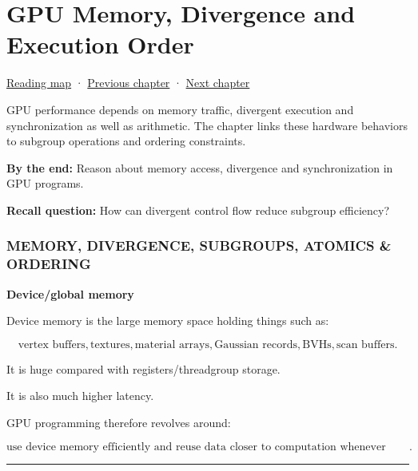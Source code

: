\chapter{GPU Memory, Divergence and Execution Order}\label{03-visual-computing-i-ch016-gpu-memory-divergence-and-execution-order}\hypertarget{03-visual-computing-i-ch016}{}\label{stagechapter:03-visual-computing-i-ch016}

\hypertarget{03-visual-computing-i-ch016-gpu-memory-divergence-and-execution-order}{}

\hyperref[volume-reading-map]{Reading map} · \hyperref[03-visual-computing-i-ch011]{Previous chapter} · \hyperref[05-engine-i-ch019]{Next chapter}

GPU performance depends on memory traffic, divergent execution and synchronization as well as arithmetic. The chapter links these hardware behaviors to subgroup operations and ordering constraints.

\textbf{By the end:} Reason about memory access, divergence and synchronization in GPU programs.

\textbf{Recall question:} How can divergent control flow reduce subgroup efficiency?

\subsection{MEMORY, DIVERGENCE, SUBGROUPS, ATOMICS \& ORDERING}\label{03-visual-computing-i-ch016-memory-divergence-subgroups-atomics-ordering}

\hypertarget{03-visual-computing-i-ch016-memory-divergence-subgroups-atomics-ordering}{}

\textbf{Device/global memory}

Device memory is the large memory space holding things such as:

\[
\text{vertex buffers},
\text{textures},
\text{material arrays},
\text{Gaussian records},
\text{BVHs},
\text{scan buffers}.
\]

It is huge compared with registers/threadgroup storage.

It is also much higher latency.

GPU programming therefore revolves around:

\[
\boxed{
\text{use device memory efficiently and reuse data closer to computation whenever possible}.
}
\]

\begin{center}\rule{0.5\linewidth}{0.5pt}\end{center}

